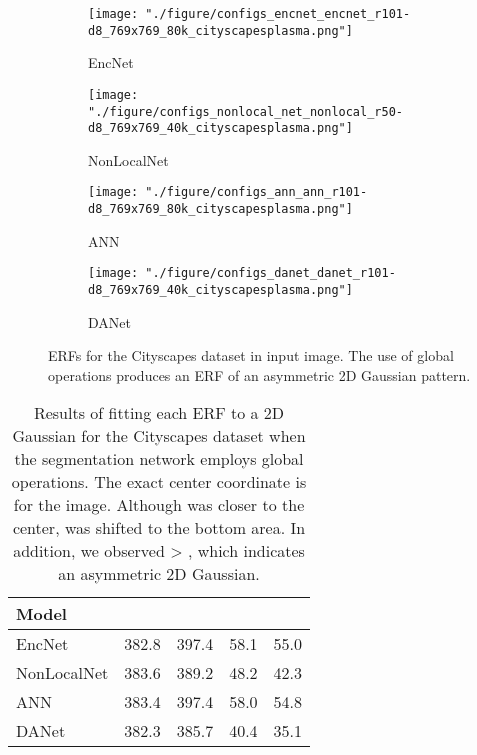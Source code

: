 \documentclass{article}
\begin{document}
\begin{figure}[t!]
	\centering
	\begin{subfigure}[b]{0.241\linewidth}
		\centering
		\texttt{[image: "./figure/configs\_encnet\_encnet\_r101-d8\_769x769\_80k\_cityscapesplasma.png"]}
		\caption{EncNet \citep{DBLP:conf/cvpr/0005DSZWTA18}}
	\end{subfigure}
	\hfill
	\begin{subfigure}[b]{0.241\linewidth}
		\centering
		\texttt{[image: "./figure/configs\_nonlocal\_net\_nonlocal\_r50-d8\_769x769\_40k\_cityscapesplasma.png"]}
		\caption{NonLocalNet \citep{DBLP:conf/cvpr/0004GGH18}}
	\end{subfigure}
	\hfill
	\begin{subfigure}[b]{0.241\linewidth}
		\centering
		\texttt{[image: "./figure/configs\_ann\_ann\_r101-d8\_769x769\_80k\_cityscapesplasma.png"]}
		\caption{ANN \citep{DBLP:conf/iccv/ZhuXBHB19}}
	\end{subfigure}
	\hfill
	\begin{subfigure}[b]{0.241\linewidth}
		\centering
		\texttt{[image: "./figure/configs\_danet\_danet\_r101-d8\_769x769\_40k\_cityscapesplasma.png"]}
		\caption{DANet \citep{DBLP:conf/cvpr/FuLT0BFL19}}
	\end{subfigure}
	\caption{ERFs for the Cityscapes dataset in  input image. The use of global operations produces an ERF of an asymmetric 2D Gaussian pattern.}
	\label{fig:asy}
\end{figure}

\begin{table}[t!]
	\caption{Results of fitting each ERF to a 2D Gaussian for the Cityscapes dataset when the segmentation network employs global operations. The exact center coordinate is  for the  image. Although  was closer to the center,  was shifted to the bottom area. In addition, we observed  > , which indicates an asymmetric 2D Gaussian.}
	\label{tab:asy}
	\centering
	\begin{tabular}{l|rrrr}
		\toprule
		Model                                        &  &  &  &  \\
		\midrule
		EncNet \citep{DBLP:conf/cvpr/0005DSZWTA18}   & 382.8 & 397.4 & 58.1       & 55.0       \\
		NonLocalNet \citep{DBLP:conf/cvpr/0004GGH18} & 383.6 & 389.2 & 48.2       & 42.3       \\
		ANN \citep{DBLP:conf/iccv/ZhuXBHB19}         & 383.4 & 397.4 & 58.0       & 54.8       \\
		DANet \citep{DBLP:conf/cvpr/FuLT0BFL19}      & 382.3 & 385.7 & 40.4       & 35.1       \\
		\bottomrule
	\end{tabular}
\end{table}
\end{document}
